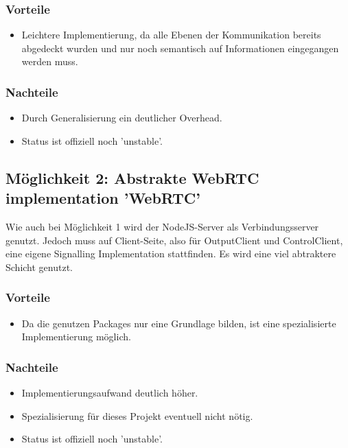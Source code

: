 \subsubsection{Vorteile}
\begin{itemize}
\item
Leichtere Implementierung, da alle Ebenen der Kommunikation bereits abgedeckt 
wurden und nur noch semantisch auf Informationen eingegangen werden muss.
\end{itemize}

\subsubsection{Nachteile}
\begin{itemize}
\item
Durch Generalisierung ein deutlicher Overhead.

\item
Status ist offiziell noch 'unstable'.
\end{itemize}



\subsection{Möglichkeit 2: Abstrakte WebRTC implementation 'WebRTC'}
Wie auch bei Möglichkeit 1 wird der NodeJS-Server als Verbindungsserver genutzt. 
Jedoch muss auf Client-Seite, also für OutputClient und ControlClient, eine 
eigene Signalling Implementation stattfinden. Es wird eine viel abtraktere 
Schicht genutzt.

\subsubsection{Vorteile}
\begin{itemize}
\item
Da die genutzen Packages nur eine Grundlage bilden, ist eine spezialisierte 
Implementierung möglich.
\end{itemize}

\subsubsection{Nachteile}
\begin{itemize}
\item
Implementierungsaufwand deutlich höher.

\item
Spezialisierung für dieses Projekt eventuell nicht nötig.

\item
Status ist offiziell noch 'unstable'.
\end{itemize}



